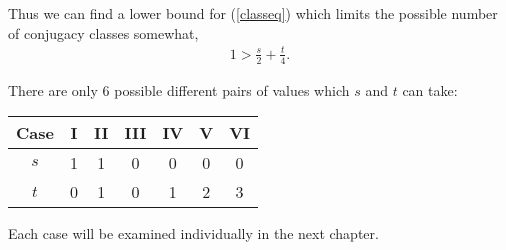 Thus we can find a lower bound for (\ref{classeq}) which limits the possible number of conjugacy classes somewhat,
\begin{align*} 1 > \frac{s}{2} + \frac{t}{4}.
\end{align*}

There are only 6 possible different pairs of values which $s$ and $t$ can take: \vspace{3mm}

\begin{center}
  \centering
    \begin{tabular}{||c||c|c|c|c|c|c||}
  \hline
  Case & I & II & III & IV & V & VI \\ [1ex]
  \hline\hline
   $s$ & 1 & 1 & 0 & 0 & 0 & 0 \\ [1ex]
  \hline
  $t$ & 0 & 1 & 0 & 1 & 2 & 3 \\ [1ex]
   \hline
  \end{tabular}
  \end{center}
\vspace{2mm}

Each case will be examined individually in the next chapter.